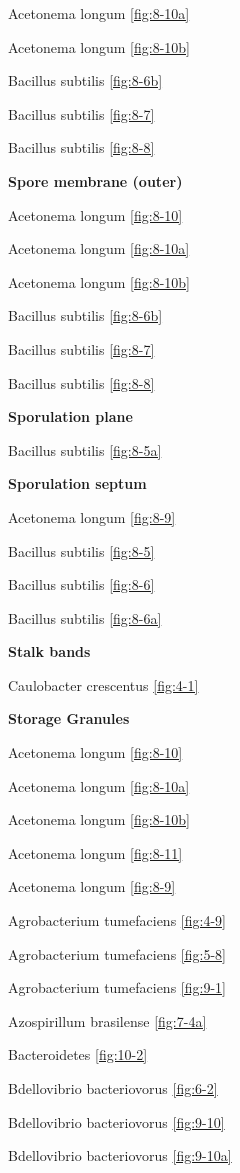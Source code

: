 \documentclass[]{tufte-book}
\begin{document}
Acetonema longum \ref{fig:8-10a}

Acetonema longum \ref{fig:8-10b}

Bacillus subtilis \ref{fig:8-6b}

Bacillus subtilis \ref{fig:8-7}

Bacillus subtilis \ref{fig:8-8}

\textbf{Spore membrane (outer)}

Acetonema longum \ref{fig:8-10}

Acetonema longum \ref{fig:8-10a}

Acetonema longum \ref{fig:8-10b}

Bacillus subtilis \ref{fig:8-6b}

Bacillus subtilis \ref{fig:8-7}

Bacillus subtilis \ref{fig:8-8}

\textbf{Sporulation plane}

Bacillus subtilis \ref{fig:8-5a}

\textbf{Sporulation septum}

Acetonema longum \ref{fig:8-9}

Bacillus subtilis \ref{fig:8-5}

Bacillus subtilis \ref{fig:8-6}

Bacillus subtilis \ref{fig:8-6a}

\textbf{Stalk bands}

Caulobacter crescentus \ref{fig:4-1}

\textbf{Storage Granules}

Acetonema longum \ref{fig:8-10}

Acetonema longum \ref{fig:8-10a}

Acetonema longum \ref{fig:8-10b}

Acetonema longum \ref{fig:8-11}

Acetonema longum \ref{fig:8-9}

Agrobacterium tumefaciens \ref{fig:4-9}

Agrobacterium tumefaciens \ref{fig:5-8}

Agrobacterium tumefaciens \ref{fig:9-1}

Azospirillum brasilense \ref{fig:7-4a}

Bacteroidetes \ref{fig:10-2}

Bdellovibrio bacteriovorus \ref{fig:6-2}

Bdellovibrio bacteriovorus \ref{fig:9-10}

Bdellovibrio bacteriovorus \ref{fig:9-10a}
\end{document}
